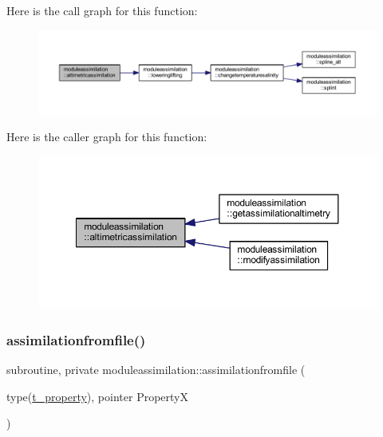 Here is the call graph for this function\+:\nopagebreak
\begin{figure}[H]
\begin{center}
\leavevmode
\includegraphics[width=350pt]{namespacemoduleassimilation_af392c1f06d8b730776cfb5680aaf95cb_cgraph}
\end{center}
\end{figure}
Here is the caller graph for this function\+:\nopagebreak
\begin{figure}[H]
\begin{center}
\leavevmode
\includegraphics[width=350pt]{namespacemoduleassimilation_af392c1f06d8b730776cfb5680aaf95cb_icgraph}
\end{center}
\end{figure}
\mbox{\label{namespacemoduleassimilation_ac07092b01bbf318f77800bb88c9f12bf}} 
\subsubsection{\texorpdfstring{assimilationfromfile()}{assimilationfromfile()}}
{\footnotesize\ttfamily subroutine, private moduleassimilation\+::assimilationfromfile (\begin{DoxyParamCaption}\item[{type(\mbox{\hyperlink{structmoduleassimilation_1_1t__property}{t\+\_\+property}}), pointer}]{PropertyX }\end{DoxyParamCaption})\hspace{0.3cm}{\ttfamily [private]}}

